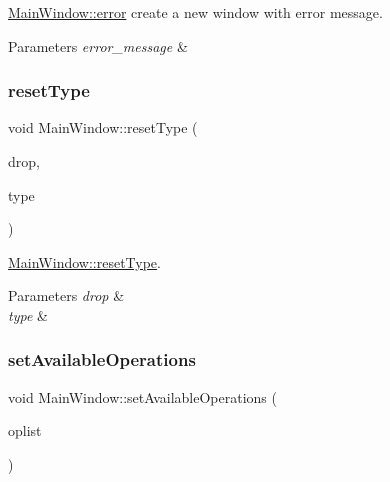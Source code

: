 \hyperlink{class_main_window_a8f2494aee2da70c23aff1c016c6b3225}{Main\+Window\+::error} create a new window with error message. 


\begin{DoxyParams}{Parameters}
{\em error\+\_\+message} & \\
\hline
\end{DoxyParams}
\mbox{\label{class_main_window_ae01409cebd6dcebf97ca2f4696fcf542}} 
\subsubsection{\texorpdfstring{reset\+Type}{resetType}}
{\footnotesize\ttfamily void Main\+Window\+::reset\+Type (\begin{DoxyParamCaption}\item[{Q\+String}]{drop,  }\item[{Q\+String}]{type }\end{DoxyParamCaption})\hspace{0.3cm}{\ttfamily [slot]}}



\hyperlink{class_main_window_ae01409cebd6dcebf97ca2f4696fcf542}{Main\+Window\+::reset\+Type}. 


\begin{DoxyParams}{Parameters}
{\em drop} & \\
\hline
{\em type} & \\
\hline
\end{DoxyParams}
\mbox{\label{class_main_window_a282ffcc1cb28b83d4f8fe510f6b2e42e}} 
\subsubsection{\texorpdfstring{set\+Available\+Operations}{setAvailableOperations}}
{\footnotesize\ttfamily void Main\+Window\+::set\+Available\+Operations (\begin{DoxyParamCaption}\item[{const Q\+Vector$<$ Q\+String $>$}]{oplist }\end{DoxyParamCaption})\hspace{0.3cm}{\ttfamily [slot]}}



